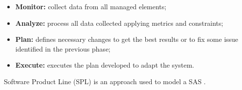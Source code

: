 \begin{itemize}
    \item \textbf{Monitor:} collect data from all managed elements;
    \item \textbf{Analyze:} process all data collected applying metrics and constraints;
    \item \textbf{Plan:} defines necessary changes to get the best results or to fix some issue identified in the previous phase;
    \item \textbf{Execute:} executes the plan developed to adapt the system.
\end{itemize}

Software Product Line (SPL) is an approach used to model a SAS \cite{SPL10}.


